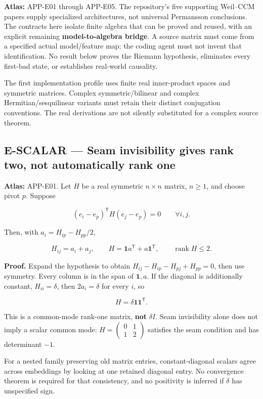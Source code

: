 \documentclass[
  11pt,
  a4paper,
]{article}
\begin{document}
\textbf{Atlas:} APP-E01 through APP-E05. The repository's five
supporting Weil--CCM papers supply specialized architectures, not
universal Permansson conclusions. The contracts here isolate finite
algebra that can be proved and reused, with an explicit remaining
\textbf{model-to-algebra bridge}. A source matrix must come from a
specified actual model/feature map; the coding agent must not invent
that identification. No result below proves the Riemann hypothesis,
eliminates every first-bad state, or establishes real-world causality.

The first implementation profile uses finite real inner-product spaces
and symmetric matrices. Complex symmetric/bilinear and complex
Hermitian/sesquilinear variants must retain their distinct conjugation
conventions. The real derivations are not silently substituted for a
complex source theorem.

\subsection{E-SCALAR --- Seam invisibility gives rank two, not
automatically rank
one}\label{e-scalar-seam-invisibility-gives-rank-two-not-automatically-rank-one}

\textbf{Atlas:} APP-E01. Let \(H\) be a real symmetric \(n\times n\)
matrix, \(n\ge1\), and choose pivot \(p\). Suppose

\[(e_i-e_p)^{\mathsf T}H(e_j-e_p)=0\qquad\forall i,j.\]

Then, with \(a_i=H_{ip}-H_{pp}/2\),

\[H_{ij}=a_i+a_j,\qquad H=\mathbf1a^{\mathsf T}+a\mathbf1^{\mathsf T},
\qquad\operatorname{rank}H\le2.\]

\textbf{Proof.} Expand the hypothesis to obtain
\(H_{ij}-H_{ip}-H_{pj}+H_{pp}=0\), then use symmetry. Every column is in
the span of \(\mathbf1,a\). If the diagonal is additionally constant,
\(H_{ii}=\delta\), then \(2a_i=\delta\) for every \(i\), so

\[H=\delta\mathbf1\mathbf1^{\mathsf T}.\]

This is a common-mode rank-one matrix, \textbf{not} \(\delta I\). Seam
invisibility alone does not imply a scalar common mode:
\(H=\left(\begin{smallmatrix}0&1\\1&2\end{smallmatrix}\right)\)
satisfies the seam condition and has determinant \(-1\).

For a nested family preserving old matrix entries, constant-diagonal
scalars agree across embeddings by looking at one retained diagonal
entry. No convergence theorem is required for that consistency, and no
positivity is inferred if \(\delta\) has unspecified sign.
\end{document}
